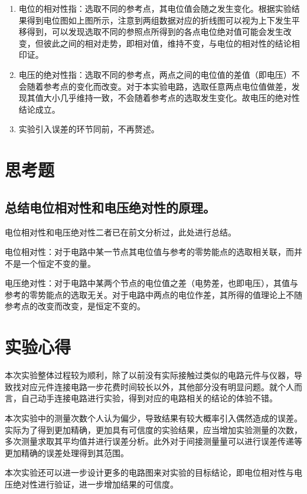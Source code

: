 \documentclass[a4paper]{article}
\begin{document}
\begin{enumerate}
    \item 电位的相对性指：选取不同的参考点，其电位值会随之发生变化。根据实验结果得到电位图如上图所示，注意到两组数据对应的折线图可以视为上下发生平移得到，可以发现选取不同的参照点所得到的各点电位绝对值可能会发生改变，但彼此之间的相对走势，即相对值，维持不变，与电位的相对性的结论相印证。
    \item 电压的绝对性指：选取不同的参考点，两点之间的电位值的差值（即电压）不会随着参考点的变化而改变。对于本实验电路，选取任意两点电位值做差，发现其值大小几乎维持一致，不会随着参考点的选取发生变化。故电压的绝对性结论成立。
    \item 实验引入误差的环节同前，不再赘述。
\end{enumerate}

\section{思考题}
\subsection{总结电位相对性和电压绝对性的原理。}
电位相对性和电压绝对性二者已在前文分析过，此处进行总结。\par 电位相对性：对于电路中某一节点其电位值与参考的零势能点的选取相关联，而并不是一个恒定不变的量。\par 电压绝对性：对于电路中某两个节点的电位值之差（电势差，也即电压），其值与参考的零势能点的选取无关。对于电路中两点的电位作差，其所得的值理论上不随参考点的改变而改变，是恒定不变的。

\section{实验心得}
本次实验整体过程较为顺利，除了以前没有实际接触过类似的电路元件与仪器，导致找对应元件连接电路一步花费时间较长以外，其他部分没有明显问题。就个人而言，自己动手连接电路进行实验，得到对应的电路相关的结论的体验不错。\par
本次实验中的测量次数个人认为偏少，导致结果有较大概率引入偶然造成的误差。实际为了得到更加精确，更加具有可信度的实验结果，应当增加实验测量的次数，多次测量求取其平均值并进行误差分析。此外对于间接测量量可以进行误差传递等更加精确的误差处理得到其范围。\par
本次实验还可以进一步设计更多的电路图来对实验的目标结论，即电位相对性与电压绝对性进行验证，进一步增加结果的可信度。\par
\end{document}
